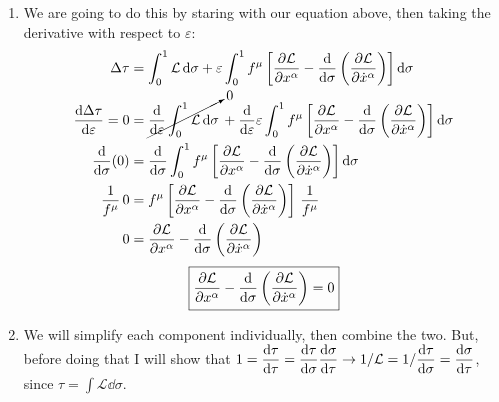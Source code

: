\documentclass[11pt]{article}
\begin{document}
\begin{enumerate}[label=\alph*)]
\item We are going to do this by staring with our equation above, then taking the derivative with respect to $\varepsilon$:
\begin{align*}
\Delta \tau & = \int_0^1 \mathcal{L}\dd{\sigma} + \varepsilon \int_0^1 f^\mu \left[\pdv{\mathcal{L}}{x^\alpha} -\dv{\sigma}\left(\pdv{\mathcal{L}}{\dot{x}^\alpha}\right)\right]\dd{\sigma} \\
\dv{\Delta \tau}{\varepsilon} = 0 & = \cancelto{0}{\dv{\varepsilon}\int_0^1 \mathcal{L}\dd{\sigma}} \, + \dv{\varepsilon} \varepsilon \int_0^1 f^\mu \left[\pdv{\mathcal{L}}{x^\alpha} -\dv{\sigma}\left(\pdv{\mathcal{L}}{\dot{x}^\alpha}\right)\right]\dd{\sigma}\\
\dv{\sigma} (0) & = \dv{\sigma} \int_0^1 f^\mu \left[\pdv{\mathcal{L}}{x^\alpha} -\dv{\sigma}\left(\pdv{\mathcal{L}}{\dot{x}^\alpha}\right)\right]\dd{\sigma}\\
\frac{1}{f^\mu} \, 0 & = f^\mu \left[\pdv{\mathcal{L}}{x^\alpha} -\dv{\sigma}\left(\pdv{\mathcal{L}}{\dot{x}^\alpha}\right)\right] \, \frac{1}{f^\mu}\\
0 & = \pdv{\mathcal{L}}{x^\alpha} -\dv{\sigma}\left(\pdv{\mathcal{L}}{\dot{x}^\alpha}\right)
\end{align*}
\[\boxed{\pdv{\mathcal{L}}{x^\alpha} -\dv{\sigma}\left(\pdv{\mathcal{L}}{\dot{x}^\alpha}\right) = 0}\]


\item 
We will simplify each component individually, then combine the two. But, before doing that I will show that $\displaystyle{1 = \dv{\tau}{\tau} = \dv{\tau}{\sigma} \dv{\sigma}{\tau} \rightarrow 1/\mathcal{L} = 1/\dv{\tau}{\sigma} = \dv{\sigma}{\tau}}$, since $\displaystyle{\tau = \int \mathcal{L}\dd{\sigma}}$.


\end{enumerate}
\end{document}
